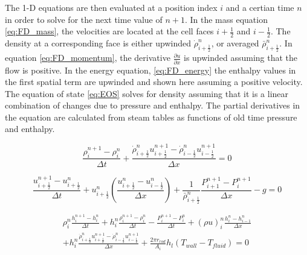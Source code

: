     The 1-D equations are then evaluated at a position index $ i $ and a certian time
    $n$ in order to solve for the next time value of $n+1$. In the mass equation
    \eqref{eq:FD_mass}, the velocities are located at the cell faces
    $i+\frac{1}{2}$ and $i-\frac{1}{2}$. The density at a corresponding face is
    either upwinded $\dot{\rho}_{i+\frac{1}{2}}^{n}$, or averaged
    $\bar{\rho}_{i+\frac{1}{2}}^{n}$. In equation \eqref{eq:FD_momentum}, the
    derivative $\frac{ \partial u}{ \partial x}$ is upwinded assuming that the
    flow is positive. In the energy equation, \eqref{eq:FD_energy} the enthalpy
    values in the first spatial term are upwinded and shown here assuming a
    positive velocity. The equation of state \eqref{eq:EOS} solves for density
    assuming that it is a linear combination of changes due to pressure and
    enthalpy. The partial derivatives in the equation are calculated from
    steam tables as functions of old time pressure and enthalpy. 
    
    \begin{equation}
    	\label{eq:FD_mass}
    	\frac{ \rho_{i}^{n+1}-\rho_{i}^{n}}{ \Delta t} +
    	\frac{ \dot{\rho}_{i+\frac{1}{2}}^{n} u_{i+\frac{1}{2}}^{n+1}  -
    	\dot{\rho}_{i-\frac{1}{2}}^{n}  u_{i-\frac{1}{2}}^{n+1} }{\Delta x}
    	 = 0
    \end{equation}
    
    \begin{equation}
    	\label{eq:FD_momentum}
    	\frac{  u_{i+\frac{1}{2}}^{n+1} - u_{i+\frac{1}{2}}^{n} }{ \Delta t } + 
    	u_{i+\frac{1}{2}}^{n} \left( \frac{  u_{i+\frac{1}{2}}^{n} -
    	u_{i-\frac{1}{2}}^{n}}{ \Delta x} \right) +
    	\frac{1}{\bar{\rho}_{i+\frac{1}{2}}^{n} } 
    	\frac{ P_{i+1}^{n+1} -P_{i}^{n+1} }{ \Delta x } - g
    	= 0
    \end{equation}
    
    \begin{multline}
    	\label{eq:FD_energy}
    	\rho_{i}^{n} \frac{ h_{i}^{n+1} - h_{i}^{n}}{\Delta t} 
    	+ h_{i}^{n} \frac{ \rho_{i}^{n+1} - \rho_{i}^{n}}{\Delta t} 
    	- \frac{P_{i}^{n+1}-P_{i}^{n}}{\Delta t}
    	+ \left( \rho u \right)_{i}^{n} 
    		\frac{   h _{i}^{n}  - h _{i-1}^{n} }{\Delta x}  \\
    	+ h _{i}^{n} \frac{ \dot{\rho}_{i+\frac{1}{2}}^{n} u_{i+\frac{1}{2}}^{n+1} 
    	- \dot{\rho}_{i-\frac{1}{2}}^{n}  u_{i-\frac{1}{2}}^{n+1} }{\Delta x}
    	+ \frac{2\pi r_{rod}}{A_{i}}h_{l}\left(T_{wall}-T_{fluid}\right)
    	= 0
    \end{multline}
    
